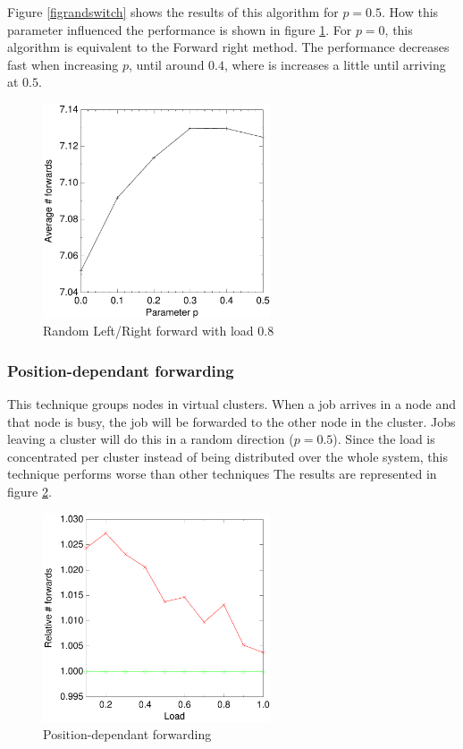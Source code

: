 \documentclass[10pt,a4paper]{article}
\begin{document}
Figure \ref{figrandswitch} shows the results of this algorithm for $p=0.5$. How this parameter influenced the performance is shown in figure \ref{figrandswitchp}. For $p=0$, this algorithm is equivalent to the Forward right method. The performance decreases fast when increasing $p$, until around $0.4$, where is increases a little until arriving at $0.5$.

\begin{figure}[h!tb]
\centering
\includegraphics[width=0.6\textwidth]{data/randswitchp.pdf}
\caption{Random Left/Right forward with load $0.8$}
\label{figrandswitchp}
\end{figure}

\subsubsection*{Position-dependant forwarding}
This technique groups nodes in virtual clusters. When a job arrives in a node and that node is busy, the job will be forwarded to the other node in the cluster. Jobs leaving a cluster will do this in a random direction ($p=0.5$). Since the load is concentrated per cluster instead of being distributed over the whole system, this technique performs worse than other techniques The results are represented in figure \ref{figevenswitch}.

\begin{figure}[h!tb]
\centering
\includegraphics[width=0.6\textwidth]{data/evenswitchright.pdf}
\caption{Position-dependant forwarding}
\label{figevenswitch}
\end{figure}
\end{document}
